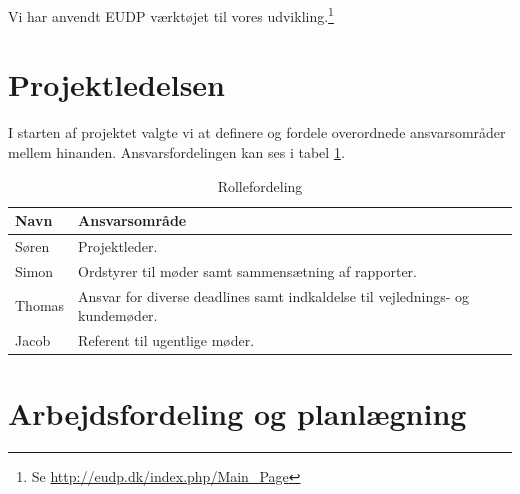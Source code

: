 
Vi har anvendt EUDP værktøjet til vores udvikling.\footnote{ Se \url{http://eudp.dk/index.php/Main_Page}}

\section{Projektledelsen}
\label{sec:projektledelsen}

I starten af projektet valgte vi at definere og fordele overordnede ansvarsområder mellem hinanden. Ansvarsfordelingen kan ses i tabel \ref{tab:rolle}.
\begin{table}[h]
  \centering
\begin{tabular}{ll}
\textbf{Navn} & \textbf{Ansvarsområde} \\
\hline
Søren & Projektleder. \\
Simon & Ordstyrer til møder samt sammensætning af rapporter. \\
Thomas & Ansvar for diverse deadlines samt indkaldelse til vejlednings- og kundemøder. \\
  Jacob & Referent til ugentlige møder. \\
  \hline
\end{tabular}
  \caption{Rollefordeling}
  \label{tab:rolle}
\end{table}

\section{Arbejdsfordeling og planlægning}
\label{sec:arbejdsfordeling:-}

